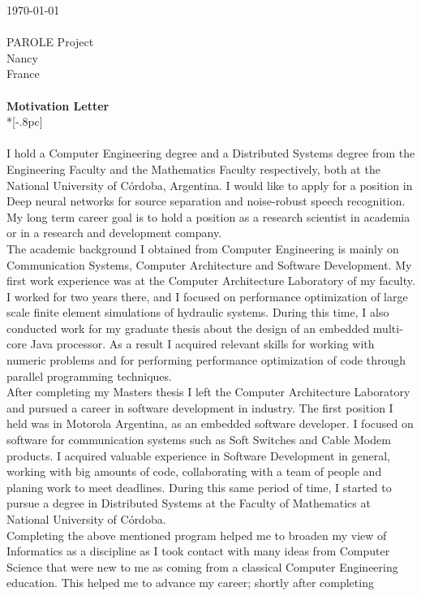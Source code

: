 \documentclass[letter,12pt,english]{article}
\begin{document}
{ \hfill \today \\ \\ 
PAROLE Project\\
Nancy\\
France\\
\\
\large
\bf Motivation Letter} \\*[-.8pc]
\\
\\
I hold a Computer Engineering degree and a Distributed Systems degree from the Engineering Faculty
and the Mathematics Faculty respectively, both at the National University of C\'ordoba, Argentina.
I would like to apply for a position in Deep neural networks for source separation and noise-robust
speech recognition. My long term career goal is to hold a position as a research scientist in 
academia or in a research and development company.
\\
The academic background I obtained from Computer Engineering is mainly on Communication Systems,
Computer Architecture and Software Development. My first work experience was at the Computer 
Architecture Laboratory of my faculty. I worked for two years there, and I focused on performance
optimization of large scale finite element simulations of hydraulic systems. During this time, I 
also conducted work for my graduate thesis about the design of an embedded multi-core Java processor.
As a result I acquired relevant skills for working with numeric problems and for
performing performance optimization of code through parallel programming techniques.
\\
After completing my Masters thesis I left the Computer Architecture Laboratory and pursued a career
in software development in industry. The first position I held was in Motorola Argentina, as an embedded
software developer. I focused on software for communication systems such as Soft Switches and Cable Modem
products. I acquired valuable experience in Software Development in general, working with big amounts of
code, collaborating with a team of people and planing work to meet deadlines. During this same period of 
time, I started to pursue a degree in Distributed Systems at the Faculty of Mathematics at National 
University of C\'ordoba.
\\
Completing the above mentioned program helped me to broaden my view of Informatics as a discipline
as I took contact with many ideas from Computer Science that were new to me as coming from a classical 
Computer Engineering education. This helped me to advance my career; shortly after completing 
\end{document}
